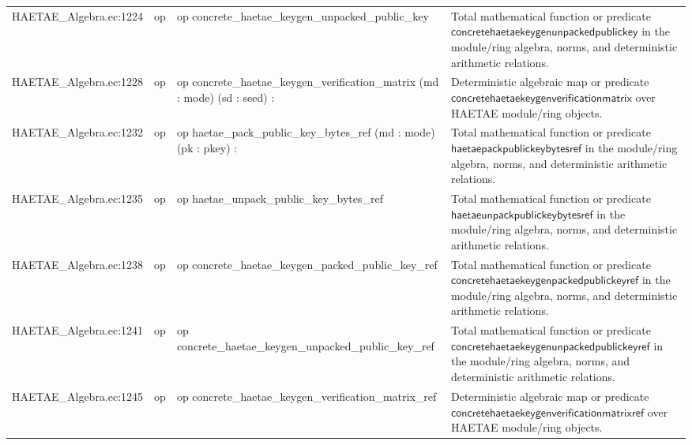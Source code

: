 \documentclass[10pt]{article}
\begin{document}
\begin{longtable}{L{0.11\textwidth}L{0.055\textwidth}L{0.385\textwidth}L{0.41\textwidth}}
HAETAE\_\allowbreak{}Algebra.\allowbreak{}ec:\allowbreak{}1224 & op & {\ttfamily\scriptsize op concrete\_\allowbreak{}haetae\_\allowbreak{}keygen\_\allowbreak{}unpacked\_\allowbreak{}public\_\allowbreak{}key} & Total mathematical function or predicate $\mathsf{concretehaetaekeygenunpackedpublickey}$ in the module/ring algebra, norms, and deterministic arithmetic relations. \\
HAETAE\_\allowbreak{}Algebra.\allowbreak{}ec:\allowbreak{}1228 & op & {\ttfamily\scriptsize op concrete\_\allowbreak{}haetae\_\allowbreak{}keygen\_\allowbreak{}verification\_\allowbreak{}matrix (md : mode) (sd : seed) :} & Deterministic algebraic map or predicate $\mathsf{concretehaetaekeygenverificationmatrix}$ over HAETAE module/ring objects. \\
HAETAE\_\allowbreak{}Algebra.\allowbreak{}ec:\allowbreak{}1232 & op & {\ttfamily\scriptsize op haetae\_\allowbreak{}pack\_\allowbreak{}public\_\allowbreak{}key\_\allowbreak{}bytes\_\allowbreak{}ref (md : mode) (pk : pkey) :} & Total mathematical function or predicate $\mathsf{haetaepackpublickeybytesref}$ in the module/ring algebra, norms, and deterministic arithmetic relations. \\
HAETAE\_\allowbreak{}Algebra.\allowbreak{}ec:\allowbreak{}1235 & op & {\ttfamily\scriptsize op haetae\_\allowbreak{}unpack\_\allowbreak{}public\_\allowbreak{}key\_\allowbreak{}bytes\_\allowbreak{}ref} & Total mathematical function or predicate $\mathsf{haetaeunpackpublickeybytesref}$ in the module/ring algebra, norms, and deterministic arithmetic relations. \\
HAETAE\_\allowbreak{}Algebra.\allowbreak{}ec:\allowbreak{}1238 & op & {\ttfamily\scriptsize op concrete\_\allowbreak{}haetae\_\allowbreak{}keygen\_\allowbreak{}packed\_\allowbreak{}public\_\allowbreak{}key\_\allowbreak{}ref} & Total mathematical function or predicate $\mathsf{concretehaetaekeygenpackedpublickeyref}$ in the module/ring algebra, norms, and deterministic arithmetic relations. \\
HAETAE\_\allowbreak{}Algebra.\allowbreak{}ec:\allowbreak{}1241 & op & {\ttfamily\scriptsize op concrete\_\allowbreak{}haetae\_\allowbreak{}keygen\_\allowbreak{}unpacked\_\allowbreak{}public\_\allowbreak{}key\_\allowbreak{}ref} & Total mathematical function or predicate $\mathsf{concretehaetaekeygenunpackedpublickeyref}$ in the module/ring algebra, norms, and deterministic arithmetic relations. \\
HAETAE\_\allowbreak{}Algebra.\allowbreak{}ec:\allowbreak{}1245 & op & {\ttfamily\scriptsize op concrete\_\allowbreak{}haetae\_\allowbreak{}keygen\_\allowbreak{}verification\_\allowbreak{}matrix\_\allowbreak{}ref} & Deterministic algebraic map or predicate $\mathsf{concretehaetaekeygenverificationmatrixref}$ over HAETAE module/ring objects. \\

\end{longtable}
\end{document}
